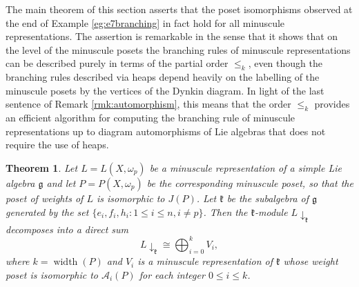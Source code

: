 \documentclass[11pt]{amsart}
\theoremstyle{plain}
\newtheorem{theorem}{Theorem}[section]
\theoremstyle{definition}
\theoremstyle{remark}
\numberwithin{equation}{section}
\newcommand{\fg}{{\mathfrak g}}
\newcommand{\fk}{{\mathfrak k}}
\newcommand{\cala}{\mathcal{A}}
\newcommand{\lxp}{L(X,\omega_p)}
\newcommand{\pxp}{P(X,\omega_p)}
\newcommand{\res}{L\!\downarrow_\fk}
\DeclareMathOperator{\width}{\mathrm{width}}
\begin{document}
The main theorem of this section asserts that the poset isomorphisms observed at
the end of Example \ref{eg:e7branching} in fact hold for all minuscule
representations. The assertion is remarkable in the sense that it shows that on
the level of the minuscule posets the branching rules of minuscule
representations can be described purely in terms of the partial order $\le_k$,
even though the branching rules described via heaps depend heavily on the
labelling of the minuscule posets by the vertices of the Dynkin diagram. In
light of the last sentence of Remark \ref{rmk:automorphism}, this means that the
order $\le_k$ provides an efficient algorithm for computing the branching rule
of minuscule representations up to diagram automorphisms of Lie algebras that
does not require the use of heaps.

\begin{theorem}\label{thm:repthy}
Let $L=\lxp$ be a minuscule representation of a simple Lie algebra $\fg$ and let
$P=\pxp$ be the corresponding minuscule poset, so that the poset of weights of $L$
is isomorphic to $J(P)$. Let $\fk$ be the subalgebra of $\fg$ generated by the
set $\{e_i,f_i,h_i: 1\le i\le n, i\neq p\}$.  Then the $\fk$-module $\res$
decomposes into a direct sum \[ \res \cong \bigoplus_{i=0}^k V_i,\] where
$k=\width(P)$ and $V_i$ is a minuscule representation of $\fk$ whose weight
poset is isomorphic to $\cala_i(P)$ for each integer $0\le i\le k$.
\end{theorem}
\end{document}
